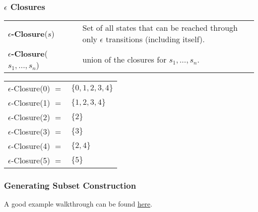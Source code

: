 \documentclass{report}
\begin{document}
            \subsubsection*{$\epsilon$ Closures}
                \begin{center}
                    \begin{tabular}{l l}
                        \textbf{$\epsilon$-Closure}($s$) & Set of all states that can be reached through only $\epsilon$ transitions (including itself). \\
                        \textbf{$\epsilon$-Closure}($s_1, \dots, s_n$) & union of the closures for $s_1, \dots, s_n$. \\
                    \end{tabular}
                \end{center}
                \begin{center}
                    \begin{tabular}{r l}
                        $\epsilon$-Closure(0) $=$ & $\{0,1,2,3,4\}$ \\
                        $\epsilon$-Closure(1) $=$ & $\{1,2,3,4\}$ \\
                        $\epsilon$-Closure(2) $=$ & $\{2\}$ \\
                        $\epsilon$-Closure(3) $=$ & $\{3\}$ \\
                        $\epsilon$-Closure(4) $=$ & $\{2,4\}$ \\
                        $\epsilon$-Closure(5) $=$ & $\{5\}$ \\
                    \end{tabular}
                \end{center}

            \subsubsection*{Generating Subset Construction}
                A good example walkthrough can be found \href{https://youtu.be/jMxuL4Xzi_A}{here}.
\end{document}
